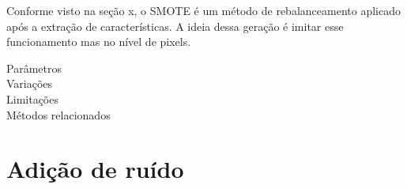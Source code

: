 Conforme visto na seção x, o SMOTE é um método de rebalanceamento aplicado após
a extração de características. A ideia dessa geração é imitar esse funcionamento
mas no nível de pixels.

\vspace{0.5cm}

\begin{description}
\item[Parâmetros]
\item[Variações]
\item[Limitações]
\item[Métodos relacionados]
\end{description}
\section{Adição de ruído}

\vspace{0.5cm}

